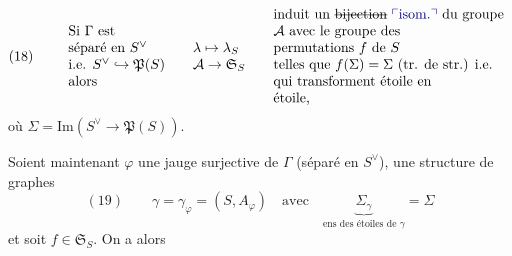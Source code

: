 \documentclass[11pt,a4paper]{article}
\begin{document}
\[
(18) \qquad
\begin{array}{l}
\text{Si } \Gamma \text{ est} \\
\text{séparé en } S^{\vee} \\
\text{i.e. } S^{\vee} \hookrightarrow \mathfrak{P}(S) \\
\text{alors}
\end{array}
\quad
\begin{array}{l}
\lambda \mapsto \lambda_S \\
\mathcal{A} \to \mathfrak{S}_S
\end{array}
\quad
\begin{array}{l}
\text{induit un \struck{bijection} \add{isom.} du groupe} \\
\mathcal{A} \text{ avec le groupe des} \\
\text{permutations } f \text{ de } S \\
\text{telles que } f(\Sigma) = \Sigma \text{ (tr. de str.) i.e.} \\
\text{qui transforment étoile en} \\
\text{étoile,}
\end{array}
\]
où $\Sigma = \mathrm{Im}(S^{\vee} \to \mathfrak{P}(S))$.

Soient maintenant $\varphi$ une jauge surjective de $\Gamma$ (séparé en $S^{\vee}$),   une structure de graphes
\[
(19) \qquad \gamma = \gamma_{\varphi} = (S, A_{\varphi}) \quad \text{avec} \quad \underbrace{\Sigma_{\gamma}}_{\text{ens des étoiles de } \gamma} = \Sigma
\]
 et soit $f \in \mathfrak{S}_S$. On a alors
\end{document}

